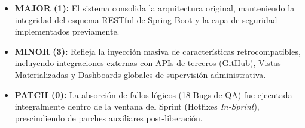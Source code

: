 \begin{itemize}[noitemsep]
    \item \textbf{MAJOR (1):} El sistema consolida la arquitectura original, manteniendo la integridad del esquema RESTful de Spring Boot y la capa de seguridad implementados previamente.
    \item \textbf{MINOR (3):} Refleja la inyección masiva de características retrocompatibles, incluyendo integraciones externas con APIs de terceros (GitHub), Vistas Materializadas y Dashboards globales de supervisión administrativa.
    \item \textbf{PATCH (0):} La absorción de fallos lógicos (18 Bugs de QA) fue ejecutada integralmente dentro de la ventana del Sprint (Hotfixes \textit{In-Sprint}), prescindiendo de parches auxiliares post-liberación.
\end{itemize}
